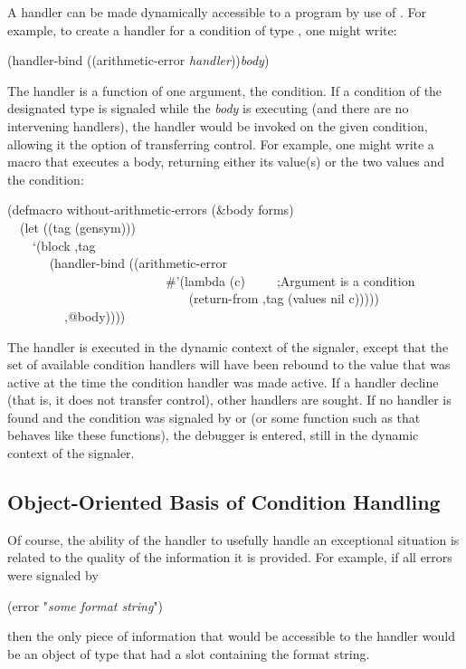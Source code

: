 A handler can be made dynamically accessible to a program by use of
. For example, to create a handler for a condition of type
, one might write:
\begingroup
\makeatletter
\def\@listi{\leftmargin\leftmargini \labelsep\leftmargin
   \parsep 3pt\relax
   \topsep 4pt plus 9pt\relax
   \itemsep\topsep}
\makeatother
\begin{lisp}
(handler-bind ((arithmetic-error \emph{handler}))\emph{body})
\end{lisp}
The handler is a function of one argument, the condition. If a condition of
the designated type is signaled while the \emph{body} is executing (and there are no
intervening handlers), the handler would be invoked on the given condition,
allowing it the option of transferring control. For example, one might write a
macro that executes a body, returning either its value(s) or the two values
 and the condition:
\begin{lisp}
(defmacro without-arithmetic-errors (\&body forms) \\
~~(let ((tag (gensym))) \\
~~~~`(block ,tag \\
~~~~~~ (handler-bind ((arithmetic-error \\
~~~~~~~~~~~~~~~~~~~~~~~~~\#'(lambda (c)~~~~~;\textrm{Argument  is a condition} \\
~~~~~~~~~~~~~~~~~~~~~~~~~~~~ (return-from ,tag (values nil c))))) \\
~~~~~~~~~,@body)))) \\
\end{lisp}
\endgroup
The handler is executed in the dynamic context of the signaler, except
that the set of available condition handlers will have been rebound to
the value that was active at the time the condition handler was made
active. If a handler decline (that is, it does not transfer control), other 
handlers are sought. If no handler is found and the condition was signaled
by  or  (or some function such as  that behaves like
these functions), the debugger is entered, still in the dynamic context 
of the signaler.

\subsection{Object-Oriented Basis of Condition Handling}
\label{OBJECT-0RIENTED-BASIS}

Of course, the ability of the handler to usefully handle an exceptional
situation is related to the quality of the information it is provided. For
example, if all errors were signaled by
\begin{lisp}
(error "\emph{some format string}")
\end{lisp}
then the only piece of information that would be accessible to the handler
would be an object of type  that had a slot containing the
format string.

